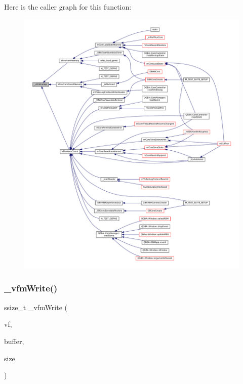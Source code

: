 Here is the caller graph for this function\+:
\nopagebreak
\begin{figure}[H]
\begin{center}
\leavevmode
\includegraphics[width=350pt]{vfs-mem_8c_adb2814f95df17c75543e3b5d5bb75c68_icgraph}
\end{center}
\end{figure}
\mbox{\label{vfs-mem_8c_a04e4a17947fad38e8dc65aa473246595}} 
\subsubsection{\texorpdfstring{\+\_\+vfm\+Write()}{\_vfmWrite()}}
{\footnotesize\ttfamily ssize\+\_\+t \+\_\+vfm\+Write (\begin{DoxyParamCaption}\item[{struct V\+File $\ast$}]{vf,  }\item[{const void $\ast$}]{buffer,  }\item[{size\+\_\+t}]{size }\end{DoxyParamCaption})\hspace{0.3cm}{\ttfamily [static]}}

